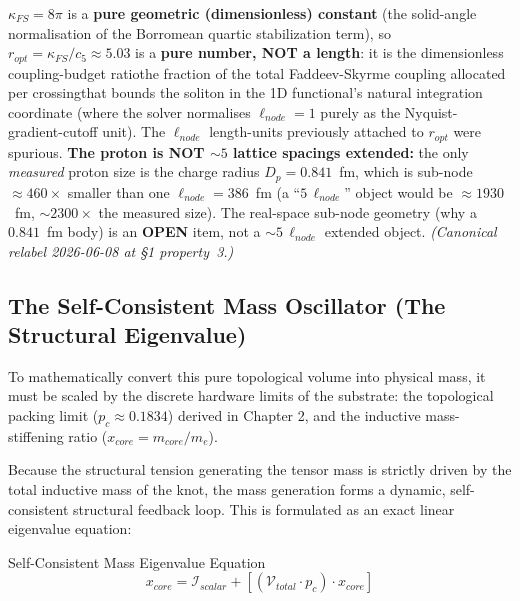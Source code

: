 $\kappa_{FS} = 8\pi$ is a \textbf{pure geometric (dimensionless) constant} (the solid-angle normalisation of the Borromean quartic stabilization term), so $r_{opt} = \kappa_{FS}/c_5 \approx 5.03$ is a \textbf{pure number, NOT a length}: it is the dimensionless coupling-budget ratio\textemdash the fraction of the total Faddeev-Skyrme coupling allocated per crossing\textemdash that bounds the soliton in the 1D functional's natural integration coordinate (where the solver normalises $\ell_{node} = 1$ purely as the Nyquist-gradient-cutoff unit). The $\ell_{node}$ length-units previously attached to $r_{opt}$ were spurious. \textbf{The proton is NOT $\sim 5$ lattice spacings extended:} the only \emph{measured} proton size is the charge radius $D_p = 0.841$~fm, which is sub-node\textemdash $\approx 460\times$ smaller than one $\ell_{node} = 386$~fm (a ``$5\,\ell_{node}$'' object would be $\approx 1930$~fm, $\sim 2300\times$ the measured size). The real-space sub-node geometry (why a $0.841$~fm body) is an \textbf{OPEN} item, not a $\sim 5\,\ell_{node}$ extended object. \emph{(Canonical relabel 2026-06-08 at  \S1 property~3.)}

\subsection{The Self-Consistent Mass Oscillator (The Structural Eigenvalue)}
To mathematically convert this pure topological volume into physical mass, it must be scaled by the discrete hardware limits of the substrate: the topological packing limit ($p_c \approx 0.1834$) derived in Chapter 2, and the inductive mass-stiffening ratio ($x_{core} = m_{core}/m_e$).

Because the structural tension generating the tensor mass is strictly driven by the total inductive mass of the knot, the mass generation forms a dynamic, self-consistent structural feedback loop. This is formulated as an exact linear eigenvalue equation:
\begin{resultbox}{Self-Consistent Mass Eigenvalue Equation}
\begin{equation}
x_{core} = \mathcal{I}_{scalar} + \left[ (\mathcal{V}_{total} \cdot p_c) \cdot x_{core} \right]
\end{equation}
\end{resultbox}


